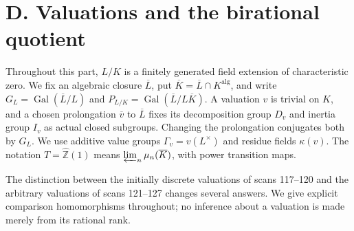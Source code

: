 \section{D. Valuations and the birational quotient}
\label{sec:DE-valuations}
Throughout this part, $L/K$ is a finitely generated field extension of characteristic zero. We fix an algebraic closure $\overline L$, put $\overline K=\overline L\cap K^{\mathrm{alg}}$, and write $G_L=\operatorname{Gal}(\overline L/L)$ and $P_{L/K}=\operatorname{Gal}(\overline L/L\overline K)$. A valuation $v$ is trivial on $K$, and a chosen prolongation $\overline v$ to $\overline L$ fixes its decomposition group $D_v$ and inertia group $I_v$ as actual closed subgroups. Changing the prolongation conjugates both by $G_L$. We use additive value groups $\Gamma_v=v(L^\times)$ and residue fields $\kappa(v)$. The notation $T=\widehat{\mathbb Z}(1)$ means $\varprojlim_n\mu_n(\overline K)$, with power transition maps.\par
The distinction between the initially discrete valuations of scans 117--120 and the arbitrary valuations of scans 121--127 changes several answers. We give explicit comparison homomorphisms throughout; no inference about a valuation is made merely from its rational rank.

